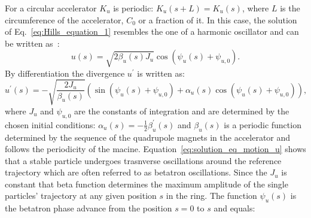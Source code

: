 For a circular accelerator $K_u$ is periodic: $K_u(s+L)=K_u(s)$, where $L$ is the circumference of the accelerator, $C_0$ or a fraction of it. In this case, the solution of Eq.~\eqref{eq:Hills_equation_1} resembles the one of a harmonic oscillator and can be written as~\cite{Lee:1425444}:
\begin{equation}\label{eq:solution_eq_motion_u}
    u(s) = \sqrt{2 \beta_u(s) J_u} \cos{(\psi_u(s)+ \psi_{u,0})}.
\end{equation} 
By differentiation the divergence $u^\prime$ is written as:
\begin{equation}\label{eq:solution_eq_motion_u_prime}
    u^\prime(s) = - \sqrt{\frac{2 J_u}{\beta_u(s)}} (\sin{(\psi_u(s) + \psi_{u,0})}+\alpha_u(s)\cos{(\psi_u(s)+ \psi_{u,0})}),
\end{equation} 
where $J_u$ and $\psi_{u,0}$ are the constants of integration and are determined by the chosen initial conditions: $\alpha_u(s)=-\frac{1}{2} \beta^\prime_u(s)$ and $\beta_u(s)$ is a periodic function determined by the sequence of the quadrupole magnets in the accelerator and follows the periodicity of the macine. Equation~\eqref{eq:solution_eq_motion_u} shows that a stable particle undergoes trasnverse oscillations around the reference trajectory which are often referred to as betatron oscillations. Since the $J_u$ is constant that beta function determines the maximum amplitude of the single particles' trajectory at any given position $s$ in the ring.
The function $\psi_u(s)$ is the betatron phase advance from the position $s=0$ to $s$ and equals:

